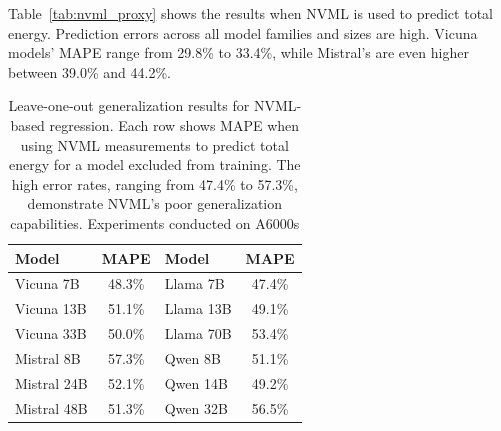 Table~\ref{tab:nvml_proxy} shows the results when NVML is used to predict total energy. %
Prediction errors across all model families and sizes are high. Vicuna models' MAPE range from 29.8\% to 33.4\%, while Mistral's are even higher between 39.0\% and 44.2\%. 




\begin{table}[t]
\centering
\small
\setlength{\tabcolsep}{3pt}
\renewcommand{\arraystretch}{1.05}

\begin{tabular}{
  @{}
  l
  c
  l
  c
  @{}
}
\toprule
\textbf{Model} & \textbf{MAPE} & \textbf{Model} & \textbf{MAPE} \\
\midrule
\rowcolor{rowblue} Vicuna 7B   & 48.3\% & Llama 7B   & 47.4\% \\
Vicuna 13B                     & 51.1\% & Llama 13B  & 49.1\% \\
\rowcolor{rowblue} Vicuna 33B  & 50.0\% & Llama 70B  & 53.4\% \\
\midrule
Mistral 8B                     & 57.3\% & Qwen 8B    & 51.1\% \\
\rowcolor{rowblue} Mistral 24B & 52.1\% & Qwen 14B   & 49.2\% \\
Mistral 48B                    & 51.3\% & Qwen 32B   & 56.5\% \\
\bottomrule
\end{tabular}

\caption{Leave-one-out generalization results for NVML-based regression. Each row shows MAPE when using NVML measurements to predict total energy for a model excluded from training. The high error rates, ranging from 47.4\% to 57.3\%, demonstrate NVML's poor generalization capabilities. Experiments conducted on A6000s}
\label{tab:nvml_loo}
\end{table}

